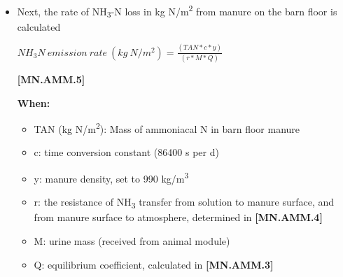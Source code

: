 \begin{refsection}
\begin{itemize}
    \begin{center}
\(ammonia\_resistance = HOUSING\_SPECIFIC\_CONSTANT * (1 - 0.027 * (20.0 - barn\ temperature)) \)
    \end{center}
        \vspace{0.5cm} 
    
            {\raggedleft \textbf{[MN.AMM.4]}\par}
            \vspace{0.5cm}

\textbf{When:}
    \begin{itemize}
        \item HOUSING\_SPECIFIC\_CONSTANT: a housing-specific constant value, set to 260 s/m.
        \item Barn temperature (\(^\circ C\)): ambient air temperature in the barn.

    \end{itemize}

        \item Next, the rate of NH\textsubscript{3}-N loss in kg N/m\textsuperscript{2} from manure on the barn floor is calculated 
         \vspace{0.2cm}

    \begin{center}
\(NH_3N\ emission\ rate\ (kg\ N/m^2)= \frac{(TAN * c * y)}{(r * M * Q)} \)
    \end{center}
        \vspace{0.5cm} 
    
            {\raggedleft \textbf{[MN.AMM.5]}\par}
            \vspace{0.5cm}

\textbf{When:}
    \begin{itemize}
        \item TAN (kg N/m\textsuperscript{2}): Mass of ammoniacal N in barn floor manure
        \item c: time conversion constant (86400 s per d)
        \item y: manure density, set to 990 kg/m\textsuperscript{3} 
        \item r: the resistance of NH\textsubscript{3} transfer from solution to manure surface, and from manure surface to atmosphere, determined in \textbf{[MN.AMM.4]}
        \item M: urine mass (received from animal module)
        \item Q: equilibrium coefficient, calculated in \textbf{[MN.AMM.3]}


\end{itemize}
\end{itemize}
\end{refsection}
